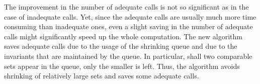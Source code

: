 The improvement in the number of adequate calls is not so significant as in the case of inadequate calls. Yet, since the adequate calls are usually much more time consuming than inadequate ones, even a slight saving in the number of adequate calls might significantly speed up the whole computation. The new algorithm saves adequate calls due to the usage of the shrinking queue and due to the invariants that are maintained by the queue. In particular, shall two comparable sets appear in the queue, only the smaller is left. Thus, the algorithm avoids shrinking of relatively large sets and saves some adequate calls.






